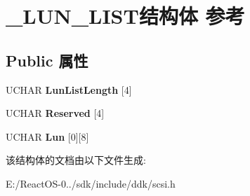 \hypertarget{struct___l_u_n___l_i_s_t}{}\section{\+\_\+\+L\+U\+N\+\_\+\+L\+I\+S\+T结构体 参考}
\label{struct___l_u_n___l_i_s_t}
\subsection*{Public 属性}
\begin{DoxyCompactItemize}
\item 
\mbox{\label{struct___l_u_n___l_i_s_t_a734b3a66e585c36e3ff7bb337b083137}} 
U\+C\+H\+AR {\bfseries Lun\+List\+Length} \mbox{[}4\mbox{]}
\item 
\mbox{\label{struct___l_u_n___l_i_s_t_a4e47eb0a8a7ea5765ee39df1062c0c17}} 
U\+C\+H\+AR {\bfseries Reserved} \mbox{[}4\mbox{]}
\item 
\mbox{\label{struct___l_u_n___l_i_s_t_a110d5de5af13c1233f2dcc619ce1d32c}} 
U\+C\+H\+AR {\bfseries Lun} \mbox{[}0\mbox{]}\mbox{[}8\mbox{]}
\end{DoxyCompactItemize}


该结构体的文档由以下文件生成\+:\begin{DoxyCompactItemize}
\item 
E\+:/\+React\+O\+S-\/0../sdk/include/ddk/scsi.\+h\end{DoxyCompactItemize}
